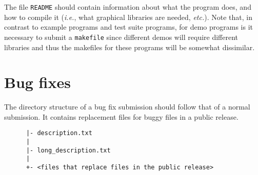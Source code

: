 The file {\tt README} should contain information about what the program does, 
and how to compile it ({\it i.e.}, what graphical libraries are needed, 
{\it etc.}). Note that, in contrast to example programs and test suite
programs, for demo programs is it necessary to submit a {\tt makefile}
 since
different demos will require different libraries and thus the makefiles
for these programs will be somewhat dissimilar.


\section{Bug fixes}
\label{sec:bug_fixes}

The directory structure of a bug fix submission should follow that of a normal
submission. It contains replacement files for buggy files in a public release.


\begin{verbatim}
      |- description.txt
      |
      |- long_description.txt
      |
      +- <files that replace files in the public release>
\end{verbatim}

